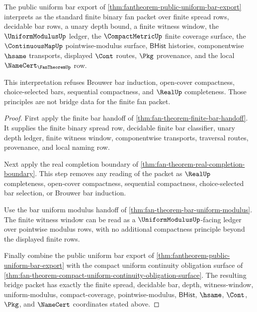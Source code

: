 \begin{theorem}
\label{thm:fan-theorem-standard-finite-fan-bridge}
The public uniform bar export of \autoref{thm:fantheorem-public-uniform-bar-export} interprets as the standard finite binary fan packet over finite spread rows, decidable bar rows, a unary depth bound, a finite witness window, the $\UniformModulusUp$ ledger, the $\CompactMetricUp$ finite coverage surface, the $\ContinuousMapUp$ pointwise-modulus surface, $\mathsf{BHist}$ histories, componentwise $\hsame$ transports, displayed $\Cont$ routes, $\Pkg$ provenance, and the local $\NameCert_{\FanTheoremUp}$ row.

This interpretation refuses Brouwer bar induction, open-cover compactness, choice-selected bars, sequential compactness, and $\RealUp$ completeness. Those principles are not bridge data for the finite fan packet.
\end{theorem}
\begin{proof}
First apply the finite bar handoff of \autoref{thm:fan-theorem-finite-bar-handoff}. It supplies the finite binary spread row, decidable finite bar classifier, unary depth ledger, finite witness window, componentwise transports, traversal routes, provenance, and local naming row.

Next apply the real completion boundary of \autoref{thm:fan-theorem-real-completion-boundary}. This step removes any reading of the packet as $\RealUp$ completeness, open-cover compactness, sequential compactness, choice-selected bar selection, or Brouwer bar induction.

Use the bar uniform modulus handoff of \autoref{thm:fan-theorem-bar-uniform-modulus}. The finite witness window can be read as a $\UniformModulusUp$-facing ledger over pointwise modulus rows, with no additional compactness principle beyond the displayed finite rows.

Finally combine the public uniform bar export of \autoref{thm:fantheorem-public-uniform-bar-export} with the compact uniform continuity obligation surface of \autoref{thm:fan-theorem-compact-uniform-continuity-obligation-surface}. The resulting bridge packet has exactly the finite spread, decidable bar, depth, witness-window, uniform-modulus, compact-coverage, pointwise-modulus, $\mathsf{BHist}$, $\hsame$, $\Cont$, $\Pkg$, and $\NameCert$ coordinates stated above.
\end{proof}

